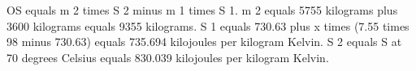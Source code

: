 OS equals m 2 times S 2 minus m 1 times S 1.  
m 2 equals 5755 kilograms plus 3600 kilograms equals 9355 kilograms.  
S 1 equals 730.63 plus x times (7.55 times 98 minus 730.63) equals 735.694 kilojoules per kilogram Kelvin.  
S 2 equals S at 70 degrees Celsius equals 830.039 kilojoules per kilogram Kelvin.